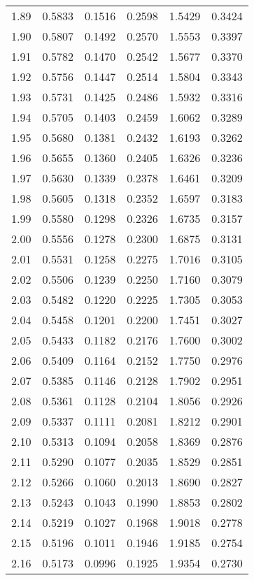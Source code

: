 \documentclass{article}
\begin{document}
\begin{longtable}{cccccc}
1.89 & 0.5833 & 0.1516 & 0.2598 & 1.5429 & 0.3424 \\
1.90 & 0.5807 & 0.1492 & 0.2570 & 1.5553 & 0.3397 \\
1.91 & 0.5782 & 0.1470 & 0.2542 & 1.5677 & 0.3370 \\
1.92 & 0.5756 & 0.1447 & 0.2514 & 1.5804 & 0.3343 \\
1.93 & 0.5731 & 0.1425 & 0.2486 & 1.5932 & 0.3316 \\
1.94 & 0.5705 & 0.1403 & 0.2459 & 1.6062 & 0.3289 \\
1.95 & 0.5680 & 0.1381 & 0.2432 & 1.6193 & 0.3262 \\
1.96 & 0.5655 & 0.1360 & 0.2405 & 1.6326 & 0.3236 \\
1.97 & 0.5630 & 0.1339 & 0.2378 & 1.6461 & 0.3209 \\
1.98 & 0.5605 & 0.1318 & 0.2352 & 1.6597 & 0.3183 \\
1.99 & 0.5580 & 0.1298 & 0.2326 & 1.6735 & 0.3157 \\
2.00 & 0.5556 & 0.1278 & 0.2300 & 1.6875 & 0.3131 \\
2.01 & 0.5531 & 0.1258 & 0.2275 & 1.7016 & 0.3105 \\
2.02 & 0.5506 & 0.1239 & 0.2250 & 1.7160 & 0.3079 \\
2.03 & 0.5482 & 0.1220 & 0.2225 & 1.7305 & 0.3053 \\
2.04 & 0.5458 & 0.1201 & 0.2200 & 1.7451 & 0.3027 \\
2.05 & 0.5433 & 0.1182 & 0.2176 & 1.7600 & 0.3002 \\
2.06 & 0.5409 & 0.1164 & 0.2152 & 1.7750 & 0.2976 \\
2.07 & 0.5385 & 0.1146 & 0.2128 & 1.7902 & 0.2951 \\
2.08 & 0.5361 & 0.1128 & 0.2104 & 1.8056 & 0.2926 \\
2.09 & 0.5337 & 0.1111 & 0.2081 & 1.8212 & 0.2901 \\
2.10 & 0.5313 & 0.1094 & 0.2058 & 1.8369 & 0.2876 \\
2.11 & 0.5290 & 0.1077 & 0.2035 & 1.8529 & 0.2851 \\
2.12 & 0.5266 & 0.1060 & 0.2013 & 1.8690 & 0.2827 \\
2.13 & 0.5243 & 0.1043 & 0.1990 & 1.8853 & 0.2802 \\
2.14 & 0.5219 & 0.1027 & 0.1968 & 1.9018 & 0.2778 \\
2.15 & 0.5196 & 0.1011 & 0.1946 & 1.9185 & 0.2754 \\
2.16 & 0.5173 & 0.0996 & 0.1925 & 1.9354 & 0.2730 \\

\end{longtable}
\end{document}
